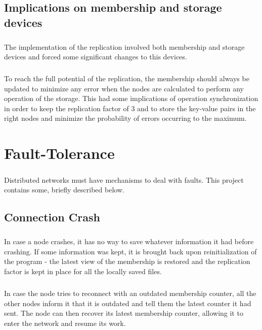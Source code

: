 \documentclass{report}
\begin{document}
			\section{Implications on membership and storage devices}
	
				\paragraph{} The implementation of the replication involved both membership
				and storage devices and forced some significant changes to this devices.
				
				\paragraph{} To reach the full potential of the replication, the membership
				should always be updated to minimize any error when the nodes are calculated
				to perform any operation of the storage. This had some implications of
				operation synchronization in order to keep the replication factor of
				3 and to store the key-value pairs in the right nodes and minimize the 
				probability of errors occurring to the maximum.

	\chapter{Fault-Tolerance}
	
		\paragraph{}Distributed networks must have mechanisms to deal with faults. This project contains some, briefly described below.
	
	    \section{Connection Crash}
	  	
	        \paragraph{}In case a node crashes, it has no way to save whatever information it had before crashing. If some information was kept, it is brought back upon reinitialization of the program - the latest view of the membership is restored and the replication factor is kept in place for all the locally saved files.
	        
	        \paragraph{}In case the node tries to reconnect with an outdated membership counter, all the other nodes inform it that it is outdated and tell them the latest counter it had sent. The node can then recover its latest membership counter, allowing it to enter the network and resume its work.
	        
\end{document}
